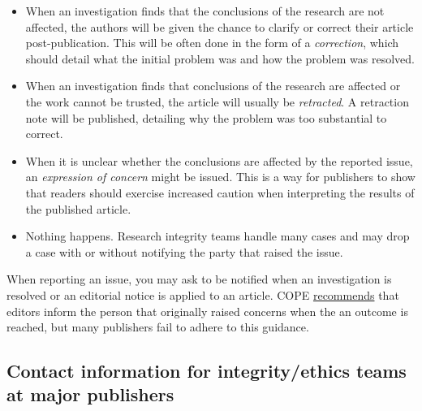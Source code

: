 \documentclass[letterpaper, 12pt]{article}
\begin{document}
\begin{itemize}
    \setlength\itemsep{-0.5em}
    \item When an investigation finds that the conclusions of the research are not affected, the authors will be given the chance to clarify or correct their article post-publication. This will be often done in the form of a \textit{correction}, which should detail what the initial problem was and how the problem was resolved.
    \item When an investigation finds that conclusions of the research are affected or the work cannot be trusted, the article will usually be \textit{retracted}. A retraction note will be published, detailing why the problem was too substantial to correct.
    \item When it is unclear whether the conclusions are affected by the reported issue, an \textit{expression of concern} might be issued. This is a way for publishers to show that readers should exercise increased caution when interpreting the results of the published article.
    \item Nothing happens. Research integrity teams handle many cases and may drop a case with or without notifying the party that raised the issue.
\end{itemize}

When reporting an issue, you may ask to be notified when an investigation is resolved or an editorial notice is applied to an article. COPE \href{https://doi.org/10.24318/cope.2019.2.25}{recommends} that editors inform the person that originally raised concerns when the an outcome is reached, but many publishers fail to adhere to this guidance.

\pagebreak
\subsection*{Contact information for integrity/ethics teams at major publishers}
\end{document}
